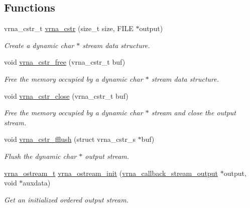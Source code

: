 \subsection*{Functions}
\begin{DoxyCompactItemize}
\item 
vrna\+\_\+cstr\+\_\+t \mbox{\hyperlink{group__buffer__utils_gadb2818f368e10a3b60a96bb3c80228d2}{vrna\+\_\+cstr}} (size\+\_\+t size, F\+I\+LE $\ast$output)
\begin{DoxyCompactList}\small\item\em Create a dynamic char $\ast$ stream data structure. \end{DoxyCompactList}\item 
void \mbox{\hyperlink{group__buffer__utils_ga7ec48ec280f699928c70428cc245dc77}{vrna\+\_\+cstr\+\_\+free}} (vrna\+\_\+cstr\+\_\+t buf)
\begin{DoxyCompactList}\small\item\em Free the memory occupied by a dynamic char $\ast$ stream data structure. \end{DoxyCompactList}\item 
void \mbox{\hyperlink{group__buffer__utils_ga5a3f6a0a73b3d2d38fe011cdaed0ad28}{vrna\+\_\+cstr\+\_\+close}} (vrna\+\_\+cstr\+\_\+t buf)
\begin{DoxyCompactList}\small\item\em Free the memory occupied by a dynamic char $\ast$ stream and close the output stream. \end{DoxyCompactList}\item 
void \mbox{\hyperlink{group__buffer__utils_gab59ad4781f7de960bdd1af5b1965c94b}{vrna\+\_\+cstr\+\_\+fflush}} (struct vrna\+\_\+cstr\+\_\+s $\ast$buf)
\begin{DoxyCompactList}\small\item\em Flush the dynamic char $\ast$ output stream. \end{DoxyCompactList}\item 
\mbox{\hyperlink{group__buffer__utils_ga8da189552af21ab6e4e88bdcc240870c}{vrna\+\_\+ostream\+\_\+t}} \mbox{\hyperlink{group__buffer__utils_gad23113e66a0910ec2341856e2da56bf6}{vrna\+\_\+ostream\+\_\+init}} (\mbox{\hyperlink{group__buffer__utils_ga4adb94338a6f0a1a451e03c1bdac0d9d}{vrna\+\_\+callback\+\_\+stream\+\_\+output}} $\ast$output, void $\ast$auxdata)
\begin{DoxyCompactList}\small\item\em Get an initialized ordered output stream. \end{DoxyCompactList}\item 

\end{DoxyCompactItemize}
